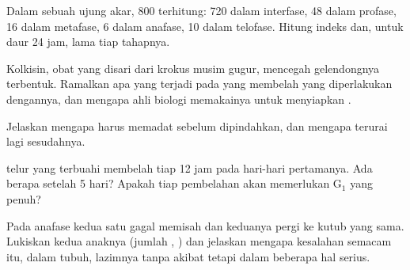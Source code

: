 \begin{exercise}[$\star\star$]\label{exo:g11:cell-cycle-mitosis:8}
Dalam sebuah ujung akar, 800  terhitung: 720 dalam interfase, 48
dalam profase, 16 dalam metafase, 6 dalam anafase, 10 dalam telofase.
Hitung indeks  dan, untuk daur 24 jam, lama tiap tahapnya.
\end{exercise}

\begin{exercise}[$\star\star$]\label{exo:g11:cell-cycle-mitosis:9}
Kolkisin, obat yang disari dari krokus musim gugur, mencegah
gelendongnya terbentuk. Ramalkan apa yang terjadi pada  yang membelah
yang diperlakukan dengannya, dan mengapa ahli biologi memakainya untuk
menyiapkan .
\end{exercise}

\begin{exercise}[$\star\star$]\label{exo:g11:cell-cycle-mitosis:10}
Jelaskan mengapa  harus memadat sebelum dipindahkan, dan
mengapa  terurai lagi sesudahnya.
\end{exercise}

\begin{exercise}[$\star\star$]\label{exo:g11:cell-cycle-mitosis:11}
 telur yang terbuahi membelah tiap 12 jam pada hari-hari pertamanya.
Ada berapa  setelah 5 hari? Apakah tiap pembelahan akan memerlukan
$\mathrm{G_1}$ yang penuh?
\end{exercise}

\begin{exercise}[$\star\star\star$]\label{exo:g11:cell-cycle-mitosis:12}
Pada anafase kedua  satu  gagal memisah dan keduanya
pergi ke kutub yang sama. Lukiskan kedua  anaknya (jumlah ,
) dan jelaskan mengapa kesalahan semacam itu, dalam  tubuh,
lazimnya tanpa akibat tetapi dalam beberapa hal serius.
\end{exercise}

